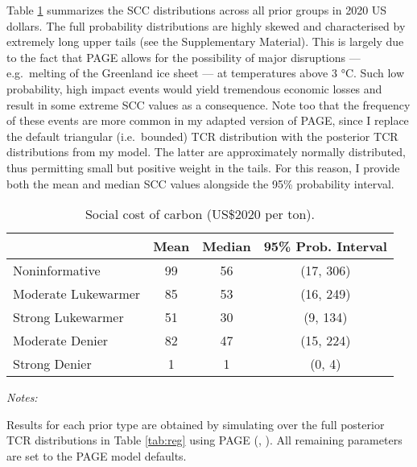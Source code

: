 \documentclass[smallextended]{svjour3}       %
\begin{document}
Table \ref{tab:scc} summarizes the SCC distributions across all prior
groups in 2020 US dollars. The full probability distributions are highly
skewed and characterised by extremely long upper tails (see the
Supplementary Material). This is largely due to the fact that PAGE
allows for the possibility of major disruptions --- e.g.~melting of the
Greenland ice sheet --- at temperatures above 3 °C. Such low
probability, high impact events would yield tremendous economic losses
and result in some extreme SCC values as a consequence. Note too that
the frequency of these events are more common in my adapted version of
PAGE, since I replace the default triangular (i.e.~bounded) TCR
distribution with the posterior TCR distributions from my model. The
latter are approximately normally distributed, thus permitting small but
positive weight in the tails. For this reason, I provide both the mean
and median SCC values alongside the 95\% probability interval.

\begin{table}

\caption{\label{tab:scc_tab}Social cost of carbon (US\$2020 per ton). \label{tab:scc}}
\centering
\begin{threeparttable}
\begin{tabular}[t]{lccc}
\toprule
 & Mean & Median & 95\% Prob. Interval\\
\midrule
Noninformative & 99 & 56 & (17, 306)\\
Moderate Lukewarmer & 85 & 53 & (16, 249)\\
Strong Lukewarmer & 51 & 30 & (9, 134)\\
Moderate Denier & 82 & 47 & (15, 224)\\
Strong Denier & 1 & 1 & (0, 4)\\
\bottomrule
\end{tabular}
\begin{tablenotes}[para]
\item \textit{Notes:} 
\item Results for each prior type are obtained by simulating over the full posterior TCR distributions in Table \ref{tab:reg} using PAGE (\cite{hope2011page09}, \cite{moore2018mimipage}). All remaining parameters are set to the PAGE model defaults.
\end{tablenotes}
\end{threeparttable}
\end{table}
\end{document}
